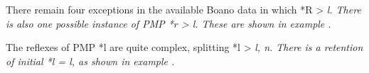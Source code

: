 \newpage
There remain four exceptions in the available Boano data in which *R > \it{l}.
There is also one possible instance of PMP *r > \it{l}.
These are shown in example .


The reflexes of PMP *l are quite complex,
splitting *l > \it{l, n}.
There is a retention of initial *l = \it{l},
as shown in example .
\\

